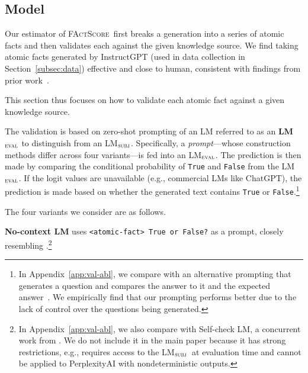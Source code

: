 \documentclass[11pt]{article}
\newcommand{\ours}{\textsc{FActScore}}
\newcommand{\subjectLM}{LM$_\textsc{subj}$}
\newcommand{\evalLM}{LM$_\textsc{eval}$}
\newcommand{\pw}[1]{%
}
\begin{document}
\subsection{Model}\label{subsec:models-validation}

Our estimator of \ours\ first breaks a generation into a series of atomic facts and then validates each against the given knowledge source. 
We find taking atomic facts generated by InstructGPT (used in data collection in Section~\ref{subsec:data}) effective and close to human, consistent with findings from prior work~\citep{chen2022generating}.
\pw{are there details of how this was measured? add a ref?}
This section thus focuses on how to validate each atomic fact against a given knowledge source.

The validation is based on zero-shot prompting of an LM referred to as an \textbf{\evalLM} to distinguish from an \subjectLM.
Specifically, a {\em prompt}---whose construction methods differ across four variants---is fed into an \evalLM.
The prediction is then made by comparing the conditional probability of \texttt{True} and \texttt{False} from the \evalLM.
If the logit values are unavailable (e.g., commercial LMs like ChatGPT), the prediction is made based on whether the generated text contains \texttt{True} or \texttt{False}.\footnote{
    In Appendix~\ref{app:val-abl}, we compare with an alternative prompting that generates a question and compares the answer to it and the expected answer~\citep{kryscinski2019evaluating,wang2020asking,gao2022attributed,manakul2023selfcheckgpt}.
    We empirically find that our prompting performs better due to the lack of control over the questions being generated.
}

\noindent 
The four variants we consider are as follows.

\vspace{.3em}
\noindent 
\textbf{No-context LM} uses \texttt{<atomic-fact> True or False?} as a prompt, closely resembling \citet{kadavath2022language}.\footnote{In Appendix~\ref{app:val-abl}, we also compare with Self-check LM, a concurrent work from \citet{manakul2023selfcheckgpt}. We do not include it in the main paper because it has strong restrictions, e.g., requires access to the \subjectLM\ at evaluation time and cannot be applied to PerplexityAI with nondeterministic outputs. %
}%
\end{document}
